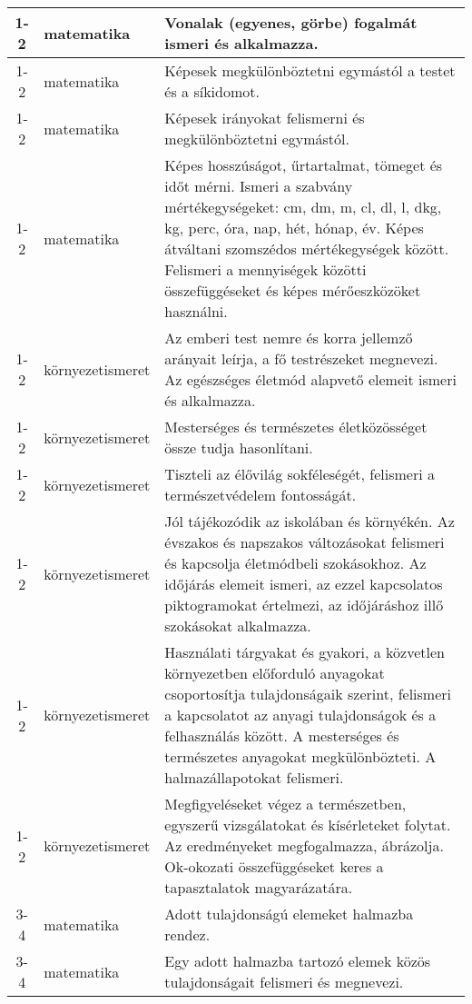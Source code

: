 \begin{small}
\begin{longtable}{c | p{2cm} |  p{11cm} }
              1-2 & matematika & Vonalak (egyenes, görbe) fogalmát ismeri és alkalmazza. \\ \hline
              1-2 & matematika & Képesek megkülönböztetni egymástól a testet és a síkidomot. \\ \hline
              1-2 & matematika & Képesek irányokat felismerni és megkülönböztetni egymástól. \\ \hline
              1-2 & matematika & Képes hosszúságot, űrtartalmat, tömeget és időt mérni. Ismeri a szabvány mértékegységeket: cm, dm, m, cl, dl, l, dkg, kg, perc, óra, nap, hét, hónap, év. Képes átváltani szomszédos mértékegységek között. Felismeri a mennyiségek közötti összefüggéseket és képes mérőeszközöket használni. \\ \hline
              1-2 & környezetismeret & Az emberi test nemre és korra jellemző arányait leírja, a fő testrészeket megnevezi. Az egészséges életmód alapvető elemeit ismeri és alkalmazza. \\ \hline
              1-2 & környezetismeret & Mesterséges és természetes életközösséget össze tudja hasonlítani. \\ \hline
              1-2 & környezetismeret & Tiszteli az élővilág sokféleségét, felismeri a természetvédelem fontosságát. \\ \hline
              1-2 & környezetismeret & Jól tájékozódik az iskolában és környékén. Az évszakos és napszakos változásokat felismeri és kapcsolja életmódbeli szokásokhoz. Az időjárás elemeit ismeri, az ezzel kapcsolatos piktogramokat értelmezi, az időjáráshoz illő szokásokat alkalmazza. \\ \hline
              1-2 & környezetismeret & Használati tárgyakat és gyakori, a közvetlen környezetben előforduló anyagokat csoportosítja tulajdonságaik szerint, felismeri a kapcsolatot az anyagi tulajdonságok és a felhasználás között. A mesterséges és természetes anyagokat megkülönbözteti. A halmazállapotokat felismeri. \\ \hline
              1-2 & környezetismeret & Megfigyeléseket végez a természetben, egyszerű vizsgálatokat és kísérleteket  folytat. Az eredményeket megfogalmazza, ábrázolja. Ok-okozati összefüggéseket keres a tapasztalatok magyarázatára. \\ \hline
              3-4 & matematika & Adott tulajdonságú elemeket halmazba rendez. \\ \hline
              3-4 & matematika & Egy adott halmazba tartozó elemek közös tulajdonságait felismeri és megnevezi. \\ \hline

\end{longtable}
\end{small}
